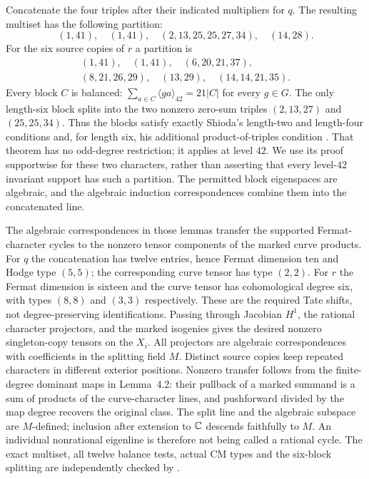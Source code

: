 Concatenate the four triples after their indicated multipliers for $q$.
The resulting multiset has the following partition:
\[
 (1,41),\quad(1,41),\quad(2,13,25,25,27,34),\quad(14,28).
\]
For the six source copies of $r$ a partition is
\[
\begin{gathered}
 (1,41),\quad(1,41),\quad(6,20,21,37),\\
 (8,21,26,29),\quad(13,29),\quad(14,14,21,35).
\end{gathered}
\]
Every block $C$ is balanced:
$\sum_{a\in C}\langle ga\rangle_{42}=21|C|$ for every $g\in G$.
The only length-six block splits into the two nonzero zero-sum triples
$(2,13,27)$ and $(25,25,34)$. Thus the blocks satisfy exactly
Shioda's length-two and length-four conditions and, for length six,
his additional product-of-triples condition
\cite[Theorem~4.3 and Lemmas~4.1--4.2, pp.~70--72]{Shioda1981}.
That theorem has no odd-degree restriction; it applies at level $42$.
We use its proof supportwise for these two characters, rather than
asserting that every level-$42$ invariant support has such a partition.
The permitted block eigenspaces are algebraic, and the algebraic
induction correspondences combine them into the concatenated line.

The algebraic correspondences in those lemmas transfer the supported
Fermat-character cycles to the nonzero tensor components of the marked
curve products. For $q$ the concatenation has twelve entries, hence
Fermat dimension ten and Hodge type $(5,5)$; the corresponding curve
tensor has type $(2,2)$. For $r$ the Fermat dimension is sixteen and the curve tensor has
cohomological degree six, with types $(8,8)$ and $(3,3)$ respectively. These are the required
Tate shifts, not degree-preserving identifications. Passing through
Jacobian $H^1$, the rational character projectors, and the marked
isogenies gives the desired nonzero singleton-copy tensors on the
$X_i$. All projectors are algebraic correspondences with coefficients
in the splitting field $M$. Distinct source copies keep repeated
characters in different exterior positions. Nonzero transfer follows
from the finite-degree dominant maps in Lemma~4.2: their pullback of
a marked summand is a sum of products of the curve-character lines,
and pushforward divided by the map degree recovers the original class.
The split line and the algebraic subspace are $M$-defined; inclusion
after extension to $\mathbb C$ descends faithfully to $M$. An individual
nonrational eigenline is therefore not being called a rational cycle.
The exact multiset, all twelve balance tests, actual CM types and the
six-block splitting are independently checked by
.

